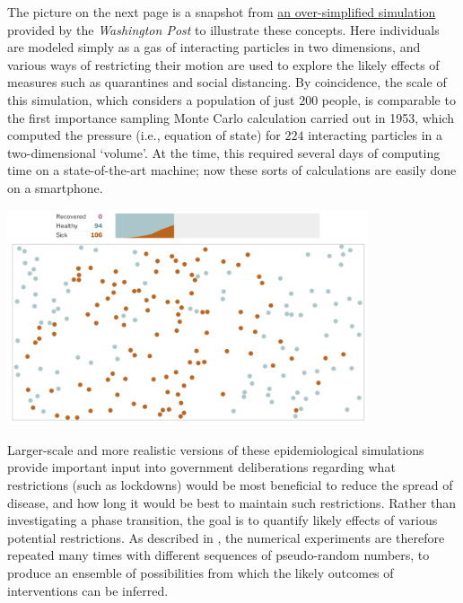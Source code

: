 The picture on the next page is a snapshot from \href{https://web.archive.org/web/20230729023947/https://www.washingtonpost.com/graphics/2020/world/corona-simulator/}{an over-simplified simulation} provided by the \textit{Washington Post} to illustrate these concepts.
Here individuals are modeled simply as a gas of interacting particles in two dimensions, and various ways of restricting their motion are used to explore the likely effects of measures such as quarantines and social distancing.
By coincidence, the scale of this simulation, which considers a population of just $200$ people, is comparable to the first importance sampling Monte Carlo calculation carried out in 1953, which computed the pressure (i.e., equation of state) for $224$ interacting particles in a two-dimensional `volume'.
At the time, this required several days of computing time on a state-of-the-art machine; now these sorts of calculations are easily done on a smartphone.

\begin{center}\includegraphics[width=0.8\textwidth]{figs/unit10_epidemic.pdf}\end{center}

Larger-scale and more realistic versions of these epidemiological simulations provide important input into government deliberations regarding what restrictions (such as lockdowns) would be most beneficial to reduce the spread of disease, and how long it would be best to maintain such restrictions.
Rather than investigating a phase transition, the goal is to quantify likely effects of various potential restrictions.
As described in , the numerical experiments are therefore repeated many times with different sequences of pseudo-random numbers, to produce an ensemble of possibilities from which the likely outcomes of interventions can be inferred.


